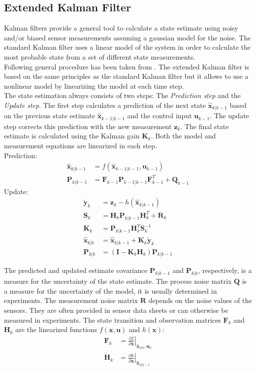 \subsection{Extended Kalman Filter}
Kalman filters provide a general tool to calculate a state estimate using noisy and/or biased sensor measurements assuming a gaussian model for the noise. The standard Kalman filter uses a linear model of the system in order to calculate the most probable state from a set of different state measurements.\\
Following general procedure has been taken from \cite{Bar-Shalom}.
The extended Kalman filter is based on the same principles as the standard Kalman filter but it allows to use a nonlinear model by linearizing the model at each time step.\\
The state estimation always consists of two steps: The \emph{Prediction step} and the \emph{Update step}. The first step calculates a prediction of the next state $\hat{\bm{x}}_{k|k-1}$ based on the previous state estimate $\hat{\bm{x}}_{k-1|k-1}$ and the control input $\bm{u}_{k-1}$. The update step corrects this prediction with the new measurement $\bm{z}_k$. The final state estimate is calculated using the Kalman gain $\bm{K}_k$. Both the model and measurement equations are linearized in each step.\\
Prediction:
\begin{align}
\hat{\bm{x}}_{k|k-1} &= f(\hat{\bm{x}}_{k-1|k-1},\bm{u}_{k-1})\\
\bm{P}_{k|k-1} &= \bm{F}_{k-1} \bm{P}_{k-1|k-1} \bm{F}_{k-1}^T + \bm{Q}_{k-1}
\end{align}
Update:
\begin{align}
\tilde{\bm{y}}_k &= \bm{z}_k - h(\hat{\bm{x}}_{k|k-1})\\
\bm{S}_k &= \bm{H}_k \bm{P}_{k|k-1} \bm{H}_k^T + \bm{R}_k\\
\bm{K}_k &= \bm{P}_{k|k-1}\bm{H}_k^T \bm{S}_k^{-1}\\
\hat{\bm{x}}_{k|k} &= \hat{\bm{x}}_{k|k-1} + \bm{K}_k \tilde{\bm{y}}_k\\
\bm{P}_{k|k} &= (\bm{I}-\bm{K}_k \bm{H}_k)\bm{P}_{k|k-1}
\end{align}

The predicted and updated estimate covariance $\bm{P}_{k|k-1}$ and $\bm{P}_{k|k}$, respectively, is a measure for the uncertainty of the state estimate. The process noise matrix $\bm{Q}$ is a measure for the uncertainty of the model, it is usually determined in experiments. The measurement noise matrix $\bm{R}$ depends on the noise values of the sensors. They are often provided in sensor data sheets or can otherwise be measured in experiments. The state transition and observation matrices $\bm F_k$ and $\bm{H}_k$ are the linearized functions $f(\bm{x},\bm{u})$ and $h(\bm{x})$:
\begin{align}
\bm{F}_k &= \left. \frac{\partial f}{\partial \bm{x}} \right|_{\hat{\bm{x}}_{k|k},\bm{u}_k}\\
\bm{H}_k &= \left. \frac{\partial h}{\partial \bm{x}} \right|_{\hat{\bm{x}}_{k|k-1}}
\end{align}
